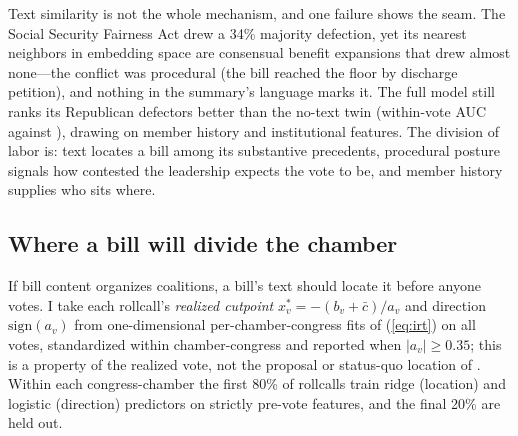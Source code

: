 \documentclass[12pt]{article}
\begin{document}
\begin{table}[tbp]
\centering
\begin{threeparttable}
\caption{Redaction experiments. Each row feeds the frozen model a
corrupted version of the exact text template it was trained on, for all
\ablRC{} legislation-linked holdout rollcalls, holding every non-text
input fixed; the defection AUC column is the noisier statistic (507
rollcalls) and log loss is the scoring rule.}
\label{tab:ablation}
{\small }
\end{threeparttable}
\end{table}

Text similarity is not the whole mechanism, and one failure shows the
seam. The Social Security Fairness Act drew a 34\% majority defection,
yet its nearest neighbors in embedding space are consensual benefit
expansions that drew almost none---the conflict was procedural (the
bill reached the floor by discharge petition), and nothing in the
summary's language marks it. The full model still ranks its
\ssfaDefectors{} Republican defectors better than the no-text twin
(within-vote AUC \ssfaAUCtext{} against \ssfaAUCnotext), drawing on
member history and institutional features. The division of labor is:
text locates a bill among its substantive precedents, procedural
posture signals how contested the leadership expects the vote to be,
and member history supplies who sits where.

\subsection{Where a bill will divide the chamber}
\label{sec:cutpoints}

If bill content organizes coalitions, a bill's text should locate it
before anyone votes. I take each rollcall's \emph{realized cutpoint}
$x_v^* = -(b_v + \bar c)/a_v$ and direction $\mathrm{sign}(a_v)$ from
one-dimensional per-chamber-congress fits of (\ref{eq:irt}) on all
votes, standardized within chamber-congress and reported when
$|a_v| \ge 0.35$; this is a property of the realized vote, not the
proposal or status-quo location of \citet{peress2013estimating}. Within
each congress-chamber the first 80\% of rollcalls train ridge (location)
and logistic (direction) predictors on strictly pre-vote features, and
the final 20\% are held out.
\end{document}
